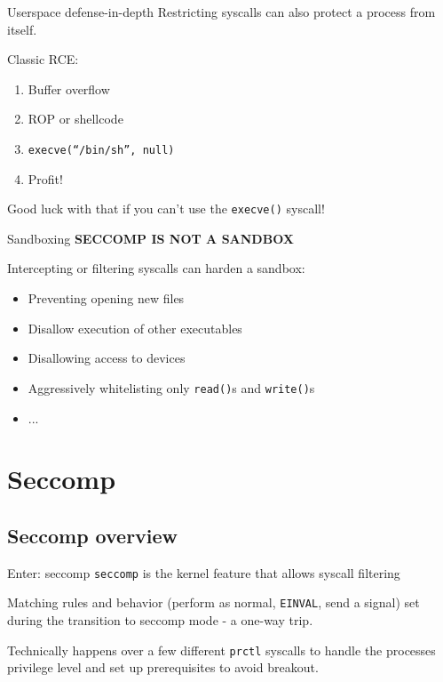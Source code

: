 \documentclass[handout]{beamer}
\begin{document}
\begin{frame}{Userspace defense-in-depth}
 Restricting syscalls can also protect a process from itself.
 
 \pause
 Classic RCE:
 \begin{enumerate}
  \item Buffer overflow
  \item ROP or shellcode
  \item \texttt{execve(``/bin/sh'', null)}
  \item Profit!
 \end{enumerate}
 \pause
 
 Good luck with that if you can't use the
 \texttt{execve()} syscall!

\end{frame}

\begin{frame}{Sandboxing}
 \textbf{SECCOMP IS NOT A SANDBOX}
 \pause
 
 Intercepting or filtering syscalls can harden a sandbox:
 \pause
 \begin{itemize}
  \item Preventing opening new files
  \item Disallow execution of other executables
  \item Disallowing access to devices
  \item Aggressively whitelisting only \texttt{read()}s and \texttt{write()}s
  \item ...
 \end{itemize}

\end{frame}

\section{Seccomp}
\subsection{Seccomp overview}
\begin{frame}{Enter: seccomp}
 \texttt{seccomp} is the kernel feature that allows syscall filtering
 
 Matching rules and behavior (perform as normal, \texttt{EINVAL}, send a signal) set during the
 transition to seccomp mode - a one-way trip.
 
 Technically happens over a few different \texttt{prctl} syscalls to handle the processes
 privilege level and set up prerequisites to avoid breakout.
\end{frame}
\end{document}
